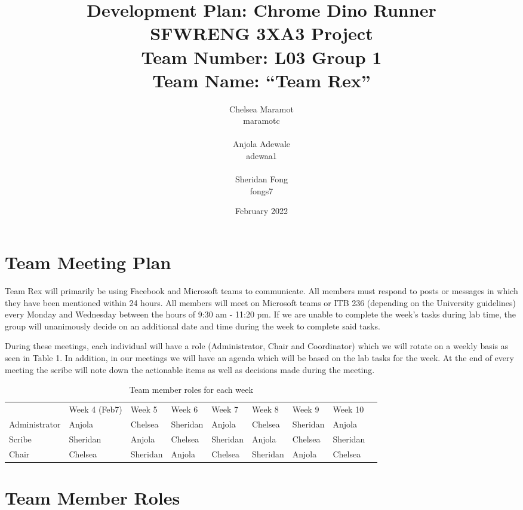 \documentclass{article}
\title{Development Plan: Chrome Dino Runner \\ \bigskip \large SFWRENG 3XA3 Project \\ \bigskip \large Team Number: L03 Group 1 \\ \large Team Name: ``Team Rex'' }
\author{Chelsea Maramot \\ maramotc \\ \\ Anjola Adewale \\ adewaa1 \\ \\ Sheridan Fong \\ fongs7 }
\date{February 2022}
\begin{document}
	
	\maketitle
	
	
	\section{Team Meeting Plan}
	
   Team Rex will primarily be using Facebook and Microsoft teams to communicate.
   All members must respond to posts or messages in which they have been mentioned within 24 hours. 
   All members will meet on Microsoft teams or ITB 236 (depending on the University guidelines) every Monday and Wednesday between the hours of 9:30 am - 11:20 pm. 
   If we are unable to complete the week’s tasks during lab time, the group will unanimously decide on an additional date and time during the week to complete said tasks.

During these meetings, each individual will have a role (Administrator, Chair and Coordinator) which we will rotate on a weekly basis as seen in Table 1. 
In addition, in our meetings we will have an agenda which will be based on the lab tasks for the week. 
At the end of every meeting the scribe will note down the actionable items as well as decisions made during the meeting.

	
	\begin{table}[]
		\caption{Team member roles for each week}
		\begin{tabular}{|l|l|l|l|l|l|l|l|l}
			
		\cline{1-8}
					& Week 4 (Feb7) & Week 5   & Week 6   & Week 7   & Week 8   & Week 9   & Week 10  &  \\ \cline{1-8}
		Administrator & Anjola        & Chelsea  & Sheridan & Anjola   & Chelsea  & Sheridan & Anjola   &  \\ \cline{1-8}
		Scribe        & Sheridan      & Anjola   & Chelsea  & Sheridan & Anjola   & Chelsea  & Sheridan &  \\ \cline{1-8}
		Chair         & Chelsea       & Sheridan & Anjola   & Chelsea  & Sheridan & Anjola   & Chelsea  &  \\ \cline{1-8}
		\end{tabular}
	
	\end{table}

	\section{Team Member Roles}
	
\end{document}
